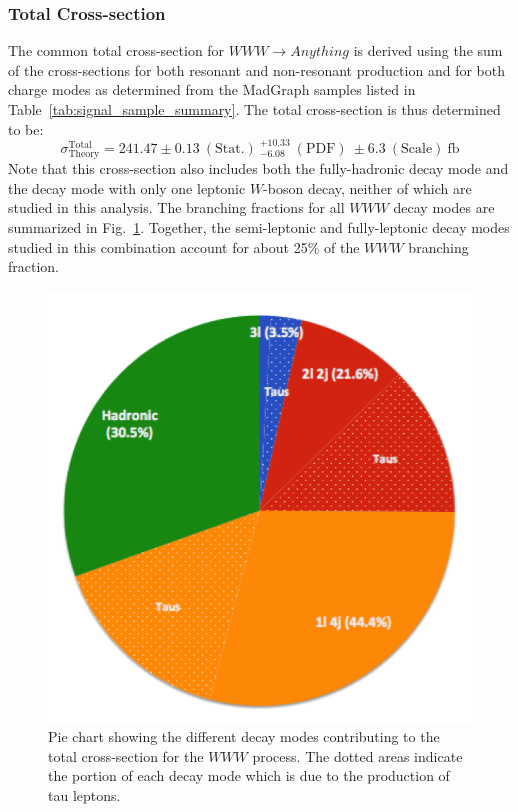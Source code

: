 \subsubsection{Total Cross-section}
\label{sec:total_xsec}
The common total cross-section for $WWW\rightarrow Anything$ is derived using the sum of the cross-sections
for both resonant and non-resonant production and for both charge modes as determined from the {\sc MadGraph} samples
listed in Table~\ref{tab:signal_sample_summary}. The total cross-section is thus
determined to be:
\begin{equation}
\sigma^{\textrm{Total}}_{\textrm{Theory}}= 241.47\pm0.13 ~(\textrm{Stat.}) ~^{+10.33}_{-6.08} ~(\textrm{PDF}) ~\pm 6.3 ~(\textrm{Scale}) ~\textrm{fb} %
\end{equation}
Note that this cross-section also includes both the fully-hadronic decay mode and the decay mode with only one leptonic 
$W$-boson decay, neither of which are studied in this analysis. The branching fractions for all $WWW$ decay modes are summarized in
Fig.~\ref{fig:branching_fractions}. Together, the semi-leptonic and fully-leptonic decay modes studied in this combination
account for about 25\% of the $WWW$ branching fraction.

\begin{figure}
\centering
\includegraphics[scale=.8]{figures/combination/branching_fractions.png}
\caption{Pie chart showing the different decay modes contributing to the total cross-section for the $WWW$ process. The dotted areas indicate the portion of each decay mode which is due to the production of tau leptons.}
\label{fig:branching_fractions}
\end{figure}




